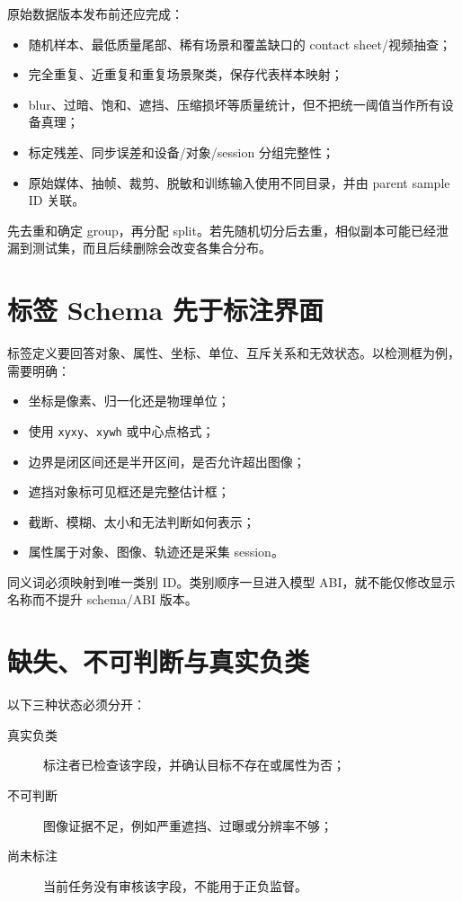 原始数据版本发布前还应完成：

\begin{itemize}
  \item 随机样本、最低质量尾部、稀有场景和覆盖缺口的 contact sheet/视频抽查；
  \item 完全重复、近重复和重复场景聚类，保存代表样本映射；
  \item blur、过暗、饱和、遮挡、压缩损坏等质量统计，但不把统一阈值当作所有设备真理；
  \item 标定残差、同步误差和设备/对象/session 分组完整性；
  \item 原始媒体、抽帧、裁剪、脱敏和训练输入使用不同目录，并由 parent sample ID 关联。
\end{itemize}

先去重和确定 group，再分配 split。若先随机切分后去重，相似副本可能已经泄漏到测试集，而且后续删除会改变各集合分布。

\section{标签 Schema 先于标注界面}

标签定义要回答对象、属性、坐标、单位、互斥关系和无效状态。以检测框为例，需要明确：

\begin{itemize}
  \item 坐标是像素、归一化还是物理单位；
  \item 使用 \texttt{xyxy}、\texttt{xywh} 或中心点格式；
  \item 边界是闭区间还是半开区间，是否允许超出图像；
  \item 遮挡对象标可见框还是完整估计框；
  \item 截断、模糊、太小和无法判断如何表示；
  \item 属性属于对象、图像、轨迹还是采集 session。
\end{itemize}

同义词必须映射到唯一类别 ID。类别顺序一旦进入模型 ABI，就不能仅修改显示名称而不提升 schema/ABI 版本。

\section{缺失、不可判断与真实负类}

以下三种状态必须分开：

\begin{description}
  \item[真实负类] 标注者已检查该字段，并确认目标不存在或属性为否；
  \item[不可判断] 图像证据不足，例如严重遮挡、过曝或分辨率不够；
  \item[尚未标注] 当前任务没有审核该字段，不能用于正负监督。
\end{description}


